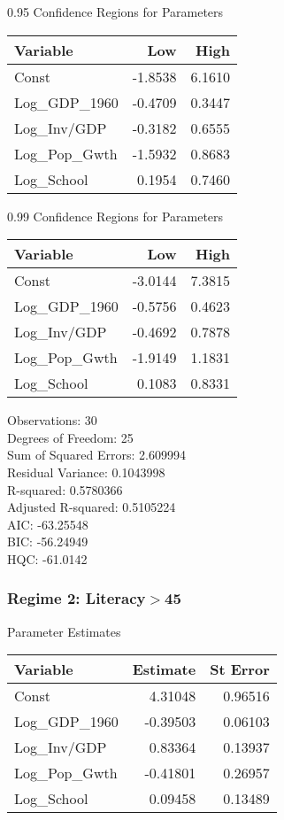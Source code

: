 0.95 Confidence Regions for Parameters \\
\begin{tabular}{l*{2}{r}}
\toprule
Variable   &    Low            &   High \\
\midrule 
Const   &   -1.8538   &   6.1610 \\
Log\_GDP\_1960   &   -0.4709   &   0.3447 \\
Log\_Inv/GDP   &   -0.3182   &   0.6555 \\
Log\_Pop\_Gwth   &   -1.5932   &   0.8683 \\
Log\_School   &    0.1954   &   0.7460 \\
\bottomrule
\end{tabular}
\bigskip 

0.99 Confidence Regions for Parameters \\
\begin{tabular}{l*{2}{r}}
\toprule
Variable   &    Low            &   High \\
\midrule 
Const   &   -3.0144   &   7.3815 \\
Log\_GDP\_1960   &   -0.5756   &   0.4623 \\
Log\_Inv/GDP   &   -0.4692   &   0.7878 \\
Log\_Pop\_Gwth   &   -1.9149   &   1.1831 \\
Log\_School   &    0.1083   &   0.8331 \\
\bottomrule
\end{tabular}
\bigskip 

Observations:                       30 \\
Degrees of Freedom:                 25 \\
Sum of Squared Errors:              2.609994 \\
Residual Variance:                  0.1043998 \\
R-squared:                          0.5780366 \\
Adjusted R-squared:                 0.5105224 \\
AIC:                                -63.25548 \\
BIC:                                -56.24949 \\
HQC:                                -61.0142 \\

\subsubsection*{Regime 2: Literacy$>$45 } 
Parameter Estimates \\
\begin{tabular}{l*{2}{r}}
\toprule
Variable    &   Estimate     &   St Error \\
\midrule 
Const   &    4.31048   &   0.96516 \\
Log\_GDP\_1960   &   -0.39503   &   0.06103 \\
Log\_Inv/GDP   &    0.83364   &   0.13937 \\
Log\_Pop\_Gwth   &   -0.41801   &   0.26957 \\
Log\_School   &    0.09458   &   0.13489 \\
\bottomrule
\end{tabular}
\bigskip 

